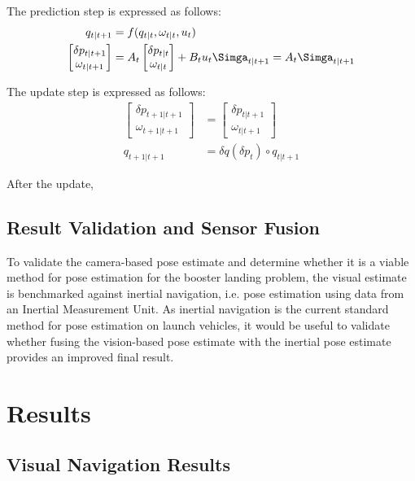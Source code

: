 \documentclass[conference]{IEEEtran}
\begin{document}
The prediction step is expressed as follows:
%
\begin{align*}
    q_{t|t+1} & = f(q_{t|t}, \omega_{t|t}, u_t) \\
     \begin{bmatrix}
         \delta p_{t|t+1} \\ \omega_{t|t+1}
     \end{bmatrix} 
     & = A_{t} 
     \begin{bmatrix}
         \delta p_{t|t} \\ \omega_{t|t}
     \end{bmatrix} + B_t u_t 
    \Simga_{t|t+1} = A_t \Simga_{t|t+1}  
\end{align*}

The update step is expressed as follows:
%
\begin{align*}
    \begin{bmatrix}
         \delta p_{t+1|t+1} \\ \omega_{t+1|t+1}
     \end{bmatrix}
     & = 
     \begin{bmatrix}
         \delta p_{t|t+1} \\ \omega_{t|t+1}
     \end{bmatrix} 
     \\
    q_{t+1|t+1} & = \delta q(\delta p_{t}) \circ q_{t|t+1}
\end{align*}

After the update, 

\subsection{Result Validation and Sensor Fusion}
To validate the camera-based pose estimate and determine whether it is a viable method for pose estimation for the booster landing problem, the visual estimate is benchmarked against inertial navigation, i.e. pose estimation using data from an Inertial Measurement Unit. 
As inertial navigation is the current standard method for pose estimation on launch vehicles, it would be useful to validate whether fusing the vision-based pose estimate with the inertial pose estimate provides an improved final result. 


\section{Results}

\subsection{Visual Navigation Results}
\end{document}
